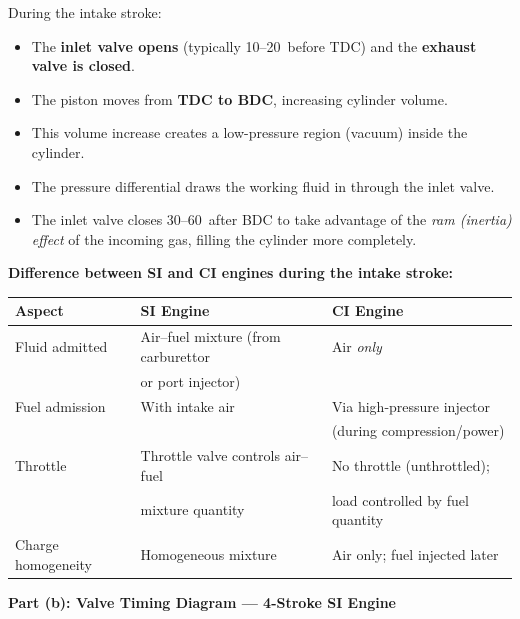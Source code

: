 \documentclass[12pt,a3paper]{article}
\begin{document}
\begin{enumerate}
\begin{tcolorbox}[enhanced,breakable,ansbox,colback=cB!4,colframe=cB,
  boxrule=0.8pt,arc=5pt,
  title={\textbf{Answer}},fonttitle=\bfseries\color{white},colbacktitle=cB]
During the intake stroke:
\begin{itemize}[leftmargin=1.5em,itemsep=2pt]
  \item The \textbf{inlet valve opens} (typically 10--20\textdegree\ before TDC)
        and the \textbf{exhaust valve is closed}.
  \item The piston moves from \textbf{TDC to BDC}, increasing cylinder volume.
  \item This volume increase creates a low-pressure region (vacuum) inside the
        cylinder.
  \item The pressure differential draws the working fluid in through the inlet
        valve.
  \item The inlet valve closes 30--60\textdegree\ after BDC to take advantage of
        the \emph{ram (inertia) effect} of the incoming gas, filling the cylinder
        more completely.
\end{itemize}

\textbf{Difference between SI and CI engines during the intake stroke:}

\begin{center}
\small
\begin{tabularx}{\linewidth}{@{}lXl@{}}
\toprule
\textbf{Aspect}         & \textbf{SI Engine}                   & \textbf{CI Engine} \\
\midrule
Fluid admitted          & Air--fuel mixture (from carburettor   & Air \emph{only} \\
                        & or port injector)                    & \\
Fuel admission          & With intake air                      & Via high-pressure injector \\
                        &                                      & (during compression/power) \\
Throttle                & Throttle valve controls air--fuel    & No throttle (unthrottled); \\
                        & mixture quantity                     & load controlled by fuel quantity \\
Charge homogeneity      & Homogeneous mixture                  & Air only; fuel injected later \\
\bottomrule
\end{tabularx}
\end{center}

\hrulefill

\textbf{Part (b): Valve Timing Diagram — 4-Stroke SI Engine}


\end{tcolorbox}
\end{enumerate}
\end{document}
